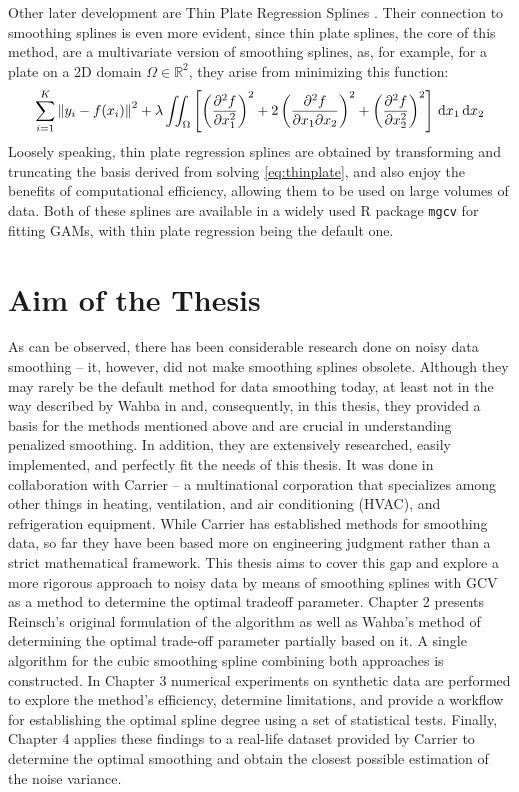 \documentclass[11pt,leqno]{book}
\theoremstyle{definition}
\theoremstyle{plain}
\theoremstyle{definition}
\begin{document}
{Other later development are Thin Plate Regression Splines \cite{thinplate}. Their connection to smoothing splines is even more evident, since thin plate splines, the core of this method, are a multivariate version of smoothing splines, as, for example, for a plate on a 2D domain $\Omega \in \mathbb{R}^2$, they arise from minimizing this function:
\begin{equation}
\sum_{i=1}^{K} \left\lVert y_i - f(x_i) \right\rVert^2
+ \lambda \iint_{\Omega} \left[
\left(\pdv[2]{f}{x_1}\right)^2
+ 2\left(\frac{\partial^2 f}{\partial x_1 \partial x_2}\right)^2
+ \left(\frac{\partial^2 f}{\partial x_2^2}\right)^2
\right] \, \dd x_1 \, \dd x_2
\label{eq:thinplate}
\end{equation}
Loosely speaking, thin plate regression splines are obtained by transforming and truncating the basis derived from solving \eqref{eq:thinplate}, and also enjoy the benefits of computational efficiency, allowing them to be used on large volumes of data.
Both of these splines are available in a widely used R package \texttt{mgcv} for fitting GAMs, with thin plate regression being the default one.
\section{Aim of the Thesis}
As can be observed, there has been considerable research done on noisy data smoothing -- it, however, did not make smoothing splines obsolete. Although they may rarely be the default method for data smoothing today, at least not in the way described by Wahba in \cite{Craven1978} and, consequently, in this thesis, they provided a basis for the methods mentioned above and are crucial in understanding penalized smoothing. In addition, they are extensively researched, easily implemented, and perfectly fit the needs of this thesis. It was done in collaboration with Carrier -- a multinational corporation that specializes among other things in heating, ventilation, and air conditioning (HVAC), and refrigeration equipment. While Carrier has established methods for smoothing data, so far they have been based more on engineering judgment rather than a strict mathematical framework. This thesis aims to cover this gap and explore a more rigorous approach to noisy data by means of smoothing splines with GCV as a method to determine the optimal tradeoff parameter. Chapter 2 presents Reinsch's original formulation of the algorithm as well as Wahba's method of determining the optimal trade-off parameter partially based on it. A single algorithm for the cubic smoothing spline combining both approaches is constructed. In Chapter 3 numerical experiments on synthetic data are performed to explore the method's efficiency, determine limitations, and provide a workflow for establishing the optimal spline degree using a set of statistical tests. Finally, Chapter 4 applies these findings to a real-life dataset provided by Carrier to determine the optimal smoothing and obtain the closest possible estimation of the noise variance.

}
\end{document}
